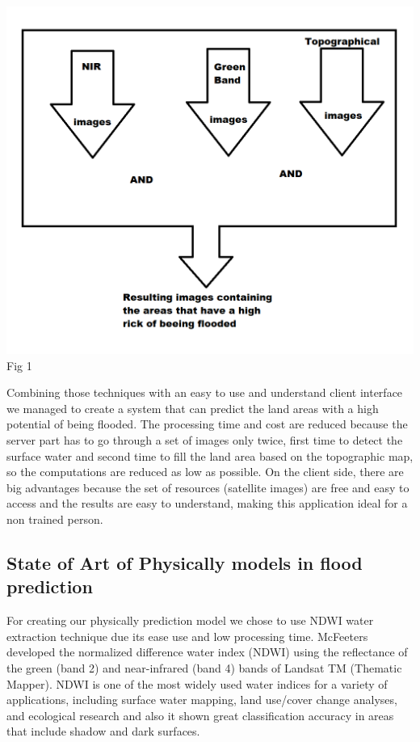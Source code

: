 \documentclass[12pt, a4paper]{report}
\begin{document}
\begin{center}
	\includegraphics[scale=0.6]{application_outline.png} 
	Fig 1
\end{center}

Combining those techniques with an easy to use and understand client interface we managed to create a system that can predict the land areas with a high potential of being flooded. The processing time and cost are reduced because the server part has to go through a set of images only twice, first time to detect the surface water and second time to fill the land area based on the topographic map, so the computations are reduced as low as possible. On the client side, there are big advantages because the set of resources (satellite images) are free and easy to access and the results are easy to understand, making this application ideal for a non trained person.
\par





\subsection{State of Art of Physically models in flood prediction}

\quad
For creating our physically prediction model we chose to use NDWI water extraction technique due its ease use and low processing time. McFeeters \cite{McFeeters} developed the normalized difference water index (NDWI) using the reflectance of the green (band 2) and near-infrared (band 4) bands of Landsat TM (Thematic Mapper). NDWI is one of the most widely used water indices for a variety of applications, including surface water mapping, land use/cover change analyses, and ecological research \cite{Duan, Poulin, Hui} and also it shown great classification accuracy in areas that include shadow and dark surfaces.
\par 
\end{document}
